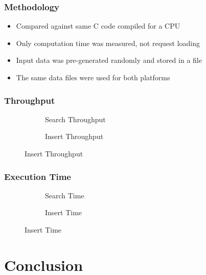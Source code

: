 \documentclass{beamer}
\begin{document}
\begin{frame}
	\frametitle{Methodology}
	\begin{itemize}
		\item Compared against same C code compiled for a CPU
		\item Only computation time was measured, not request loading
		\item Input data was pre-generated randomly and stored in a file
		\item The same data files were used for both platforms
	\end{itemize}
\end{frame}


\begin{frame}
	\frametitle{Throughput}
	\begin{figure}
		\begin{subfigure}{0.49\textwidth}
			\resizebox{\textwidth}{!}{
				
			}
			\caption{Search Throughput}
		\end{subfigure}
		\begin{subfigure}{0.49\textwidth}
			\resizebox{\textwidth}{!}{
				
			}
			\caption{Insert Throughput}
		\end{subfigure}
	\end{figure}
\end{frame}


\begin{frame}
	\frametitle{Execution Time}
	\begin{figure}
		\begin{subfigure}{0.49\textwidth}
			\resizebox{\textwidth}{!}{
				
			}
			\caption{Search Time}
		\end{subfigure}
		\begin{subfigure}{0.49\textwidth}
			\resizebox{\textwidth}{!}{
				
			}
			\caption{Insert Time}
		\end{subfigure}
	\end{figure}
\end{frame}


\section{Conclusion}
\end{document}

